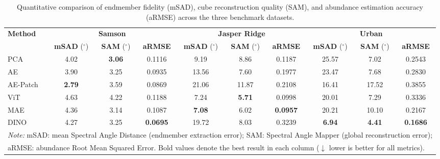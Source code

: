 \begin{table}[t]
\centering
\caption{Quantitative comparison of endmember fidelity (mSAD), cube reconstruction quality (SAM), and abundance estimation accuracy (aRMSE) across the three benchmark datasets.}
\label{tab:quantitative_metrics}
\renewcommand{\arraystretch}{1.15}
\begin{tabular}{l ccc ccc ccc}
\toprule
\multirow{2}{*}{\textbf{Method}} & \multicolumn{3}{c}{\textbf{Samson}} & \multicolumn{3}{c}{\textbf{Jasper Ridge}} & \multicolumn{3}{c}{\textbf{Urban}} \\
\cmidrule(lr){2-4} \cmidrule(lr){5-7} \cmidrule(lr){8-10}
 & \textbf{mSAD} ($^\circ$) & \textbf{SAM} ($^\circ$) & \textbf{aRMSE} & \textbf{mSAD} ($^\circ$) & \textbf{SAM} ($^\circ$) & \textbf{aRMSE} & \textbf{mSAD} ($^\circ$) & \textbf{SAM} ($^\circ$) & \textbf{aRMSE} \\
\midrule
PCA       & 4.02          & \textbf{3.06} & 0.1116          & 9.19          & 8.86          & 0.1187          & 25.57         & 7.02          & 0.2543 \\
AE        & 3.90          & 3.25          & 0.0935          & 13.56         & 7.60          & 0.1977          & 23.47         & 7.68          & 0.2830 \\
AE-Patch & \textbf{2.79} & 3.59          & 0.0869          & 21.06         & 11.87         & 0.2108          & 16.41         & 17.52         & 0.3855 \\
ViT       & 4.63          & 4.22          & 0.1188          & 7.24          & \textbf{5.71} & 0.0998          & 20.01         & 7.29          & 0.3336 \\
MAE       & 4.36          & 3.14          & 0.1087          & \textbf{7.08} & 6.02          & \textbf{0.0957} & 20.21         & 10.10         & 0.2167 \\
DINO      & 4.27          & 3.25          & \textbf{0.0695} & 19.72         & 8.03          & 0.3239          & \textbf{6.94} & \textbf{4.41} & \textbf{0.1686} \\
\bottomrule
\multicolumn{10}{l}{\footnotesize \textit{Note:} mSAD: mean Spectral Angle Distance (endmember extraction error); SAM: Spectral Angle Mapper (global reconstruction error);} \\
\multicolumn{10}{l}{\footnotesize aRMSE: abundance Root Mean Squared Error. Bold values denote the best result in each column ($\downarrow$ lower is better for all metrics).}
\end{tabular}
\end{table}

